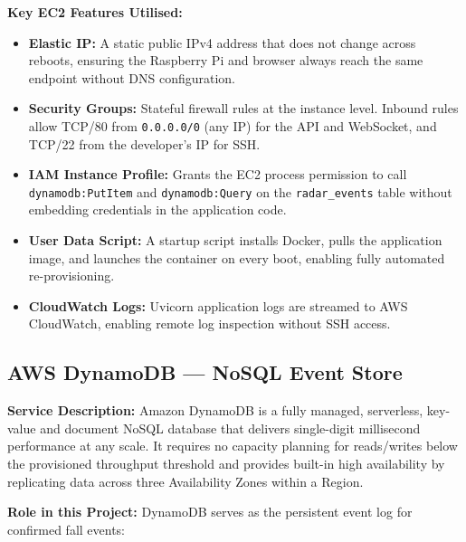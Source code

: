 \textbf{Key EC2 Features Utilised:}

\begin{itemize}
    \item \textbf{Elastic IP:} A static public IPv4 address that does not change across reboots, ensuring the Raspberry Pi and browser always reach the same endpoint without DNS configuration.
    \item \textbf{Security Groups:} Stateful firewall rules at the instance level. Inbound rules allow TCP/80 from \texttt{0.0.0.0/0} (any IP) for the API and WebSocket, and TCP/22 from the developer's IP for SSH.
    \item \textbf{IAM Instance Profile:} Grants the EC2 process permission to call \texttt{dynamodb:PutItem} and \texttt{dynamodb:Query} on the \texttt{radar\_events} table without embedding credentials in the application code.
    \item \textbf{User Data Script:} A startup script installs Docker, pulls the application image, and launches the container on every boot, enabling fully automated re-provisioning.
    \item \textbf{CloudWatch Logs:} Uvicorn application logs are streamed to AWS CloudWatch, enabling remote log inspection without SSH access.
\end{itemize}

\subsection{AWS DynamoDB --- NoSQL Event Store}

\textbf{Service Description:} Amazon DynamoDB is a fully managed, serverless, key-value and document NoSQL database that delivers single-digit millisecond performance at any scale. It requires no capacity planning for reads/writes below the provisioned throughput threshold and provides built-in high availability by replicating data across three Availability Zones within a Region.

\textbf{Role in this Project:} DynamoDB serves as the persistent event log for confirmed fall events:

